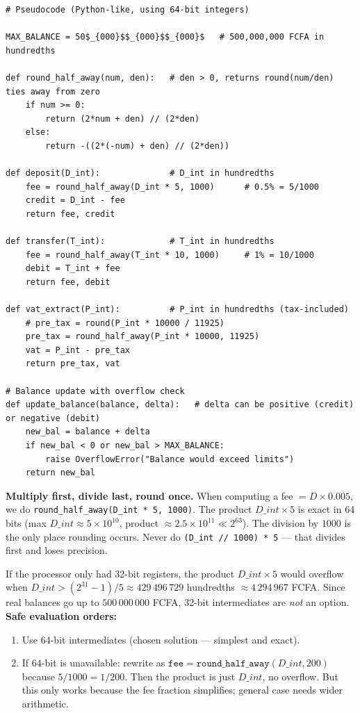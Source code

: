 \documentclass[11pt]{article}
\newcounter{popsec}
\newcounter{popsub}
\newcommand{\courssub}[1]{%
  \stepcounter{popsub}%
  \par\vspace{9pt}\noindent{\popxbold\fontsize{11.5}{13}\selectfont\color{popink}{\color{poporange}\thepopsec.\thepopsub}\hspace{6pt}#1}\par\nopagebreak\vspace{4pt}
}
\begin{document}
\begin{verbatim}
# Pseudocode (Python-like, using 64-bit integers)

MAX_BALANCE = 50$_{000}$$_{000}$$_{000}$   # 500,000,000 FCFA in hundredths

def round_half_away(num, den):   # den > 0, returns round(num/den) ties away from zero
    if num >= 0:
        return (2*num + den) // (2*den)
    else:
        return -((2*(-num) + den) // (2*den))

def deposit(D_int):              # D_int in hundredths
    fee = round_half_away(D_int * 5, 1000)      # 0.5% = 5/1000
    credit = D_int - fee
    return fee, credit

def transfer(T_int):             # T_int in hundredths
    fee = round_half_away(T_int * 10, 1000)     # 1% = 10/1000
    debit = T_int + fee
    return fee, debit

def vat_extract(P_int):          # P_int in hundredths (tax-included)
    # pre_tax = round(P_int * 10000 / 11925)
    pre_tax = round_half_away(P_int * 10000, 11925)
    vat = P_int - pre_tax
    return pre_tax, vat

# Balance update with overflow check
def update_balance(balance, delta):   # delta can be positive (credit) or negative (debit)
    new_bal = balance + delta
    if new_bal < 0 or new_bal > MAX_BALANCE:
        raise OverflowError("Balance would exceed limits")
    return new_bal
\end{verbatim}

\begin{attention}
\textbf{Multiply first, divide last, round once.}
When computing a fee $= D \times 0.005$, we do \texttt{round\_half\_away(D\_int * 5, 1000)}.
The product $D\_int \times 5$ is exact in 64 bits (max $D\_int \approx 5\times10^{10}$, product $\approx 2.5\times10^{11} \ll 2^{63}$).
The division by $1000$ is the only place rounding occurs. Never do \texttt{(D\_int // 1000) * 5} — that divides first and loses precision.
\end{attention}

\courssub{Task 5 — Exception Handling}

\begin{exemplebox}
If the processor only had 32-bit registers, the product $D\_int \times 5$ would overflow when
$D\_int > (2^{31}-1)/5 \approx 429\,496\,729$ hundredths $\approx 4\,294\,967$ FCFA.
Since real balances go up to $500\,000\,000$ FCFA, 32-bit intermediates are \emph{not} an option.
\textbf{Safe evaluation orders:}
\begin{enumerate}
\item Use 64-bit intermediates (chosen solution — simplest and exact).
\item If 64-bit is unavailable: rewrite as $\texttt{fee} = \texttt{round\_half\_away}(D\_int, 200)$ because $5/1000 = 1/200$. Then the product is just $D\_int$, no overflow. But this only works because the fee fraction simplifies; general case needs wider arithmetic.
\end{enumerate}
\end{exemplebox}
\end{document}
